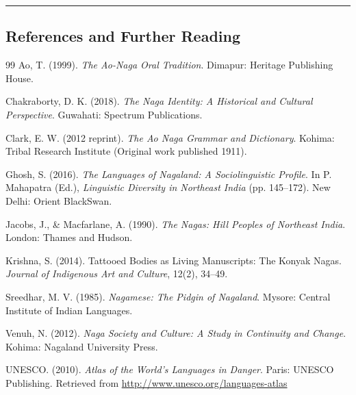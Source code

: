 \documentclass{article}
\begin{document}
\vspace{0.5cm}
\rule{\textwidth}{0.4pt}
\subsection*{References and Further Reading}
\begin{thebibliography}{99}
 Ao, T. (1999). \textit{The Ao-Naga Oral Tradition}. Dimapur: Heritage Publishing House.

 Chakraborty, D. K. (2018). \textit{The Naga Identity: A Historical and Cultural Perspective}. Guwahati: Spectrum Publications.

 Clark, E. W. (2012 reprint). \textit{The Ao Naga Grammar and Dictionary}. Kohima: Tribal Research Institute (Original work published 1911).

 Ghosh, S. (2016). \textit{The Languages of Nagaland: A Sociolinguistic Profile}. In P. Mahapatra (Ed.), \textit{Linguistic Diversity in Northeast India} (pp. 145–172). New Delhi: Orient BlackSwan.

 Jacobs, J., \& Macfarlane, A. (1990). \textit{The Nagas: Hill Peoples of Northeast India}. London: Thames and Hudson.

 Krishna, S. (2014). Tattooed Bodies as Living Manuscripts: The Konyak Nagas. \textit{Journal of Indigenous Art and Culture}, 12(2), 34–49.

 Sreedhar, M. V. (1985). \textit{Nagamese: The Pidgin of Nagaland}. Mysore: Central Institute of Indian Languages.

 Venuh, N. (2012). \textit{Naga Society and Culture: A Study in Continuity and Change}. Kohima: Nagaland University Press.

 UNESCO. (2010). \textit{Atlas of the World's Languages in Danger}. Paris: UNESCO Publishing. Retrieved from \url{http://www.unesco.org/languages-atlas}
\end{thebibliography}
\end{document}
